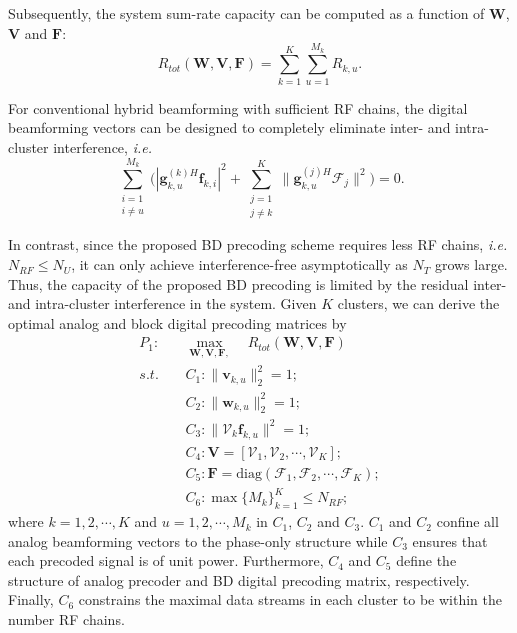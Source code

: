 \documentclass[conference]{IEEEtran}
\begin{document}
{Subsequently, the system sum-rate capacity can be computed as a function of $\bm{W}$, ${\bm V}$ and ${\bm F}$:
\begin{equation}
R_{tot}(\bm{W}, \bm{V}, \bm{F})=\sum_{k=1}^{K}\sum_{u=1}^{M_k}R_{k,u}.
\end{equation}

For conventional hybrid beamforming with sufficient RF chains, the digital beamforming vectors can be designed to completely eliminate inter- and intra-cluster interference, {\em i.e.}
\begin{equation}
 \displaystyle\sum_{\substack{i=1 \\ i\neq u}}^{M_k}\Big(|{\bm{g}}_{k,u}^{(k)H}\bm{f}_{k,i}|^2+\displaystyle\sum_{\substack{j=1\\j\neq k}}^{K}\|\bm{g}_{k,u}^{(j)H}\bm{\mathcal{F}}_j\|^2\Big)={0}.
\end{equation}

In contrast, since the proposed BD precoding scheme requires less RF chains, {\em i.e.} $N_{RF}\leq N_U$, it can only achieve interference-free asymptotically as $N_T$ grows large. Thus, the capacity of the proposed BD precoding is limited by the residual inter- and intra-cluster interference in the system. Given $K$ clusters, we can derive the optimal analog and block digital precoding matrices by
\begin{align}\label{eq:maxsumrate}
P_1: \quad&\max_{\bm W, \bm{V},\bm F, }\quad R_{tot}(\bm{W}, \bm{V}, \bm{F})\\ \nonumber
s.t. \quad&C_1: \|\bm{v}_{k,u}\|^2_2=1; \\
&C_2: \|\bm{w}_{k,u}\|^2_2=1;\nonumber\\
&C_3: \|\bm{\mathcal{V}}_k \bm{f}_{k,u}\|^2=1;\nonumber\\
&C_4: \bm{V} = [\bm{\mathcal{V}}_1, \bm{\mathcal{V}}_2, \cdots, \bm{\mathcal{V}}_K];\nonumber\\
&C_5: \bm{F} = \text{diag}(\bm{\mathcal{F}}_1, \bm{\mathcal{F}}_2, \cdots, \bm{\mathcal{F}}_{K});\nonumber\\
&C_6: \max \{M_k\}_{k=1}^K \leq N_{RF};\nonumber
\end{align}
where $k=1,2,\cdots,K$ and $u = 1, 2, \cdots, M_k$ in $C_1$, $C_2$ and $C_3$. $C_1$ and $C_2$ confine all analog beamforming vectors to the phase-only structure while $C_3$ ensures that each precoded signal is of unit power. Furthermore, $C_4$ and $C_5$ define the structure of analog precoder and BD digital precoding matrix, respectively. Finally,  $C_6$ constrains the maximal data streams in each cluster to be within the number RF chains.

}
\end{document}
